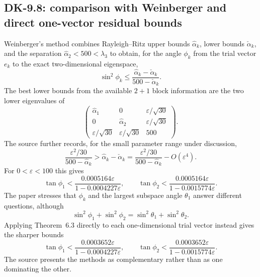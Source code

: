 \subsection*{DK-9.8: comparison with Weinberger and direct one-vector residual bounds}
Weinberger's method combines Rayleigh--Ritz upper bounds $\widehat\alpha_k$, lower bounds $\check\alpha_k$, and the separation $\widehat\alpha_2<500<\lambda_3$ to obtain, for the angle $\phi_k$ from the trial vector $e_k$ to the exact two-dimensional eigenspace,
\[
 \sin^2\phi_k\le
 \frac{\widehat\alpha_k-\check\alpha_k}{500-\check\alpha_k}.
\]
The best lower bounds from the available $2+1$ block information are the two lower eigenvalues of
\[
 \begin{pmatrix}
 \widehat\alpha_1&0&\varepsilon/\sqrt{30}\\
 0&\widehat\alpha_2&\varepsilon/\sqrt{30}\\
 \varepsilon/\sqrt{30}&\varepsilon/\sqrt{30}&500
 \end{pmatrix}.
\]
The source further records, for the small parameter range under discussion,
\[
 \frac{\varepsilon^2/30}{500-\widehat\alpha_k}
 >\widehat\alpha_k-\check\alpha_k
 =\frac{\varepsilon^2/30}{500-\widehat\alpha_k}-O(\varepsilon^4).
\]
For $0<\varepsilon<100$ this gives
\begin{equation}
 \tan\phi_1<\frac{0.0005164\varepsilon}{1-0.0004227\varepsilon},
 \qquad
 \tan\phi_2<\frac{0.0005164\varepsilon}{1-0.0015774\varepsilon}.
 \tag{9.8}
\end{equation}
The paper stresses that $\phi_k$ and the largest subspace angle $\theta_1$ answer different questions, although
\[
 \sin^2\phi_1+\sin^2\phi_2=\sin^2\theta_1+\sin^2\theta_2.
\]
Applying Theorem~6.3 directly to each one-dimensional trial vector instead gives the sharper bounds
\[
 \tan\phi_1<\frac{0.0003652\varepsilon}{1-0.0004227\varepsilon},
 \qquad
 \tan\phi_2<\frac{0.0003652\varepsilon}{1-0.0015774\varepsilon}.
\]
The source presents the methods as complementary rather than as one dominating the other.

